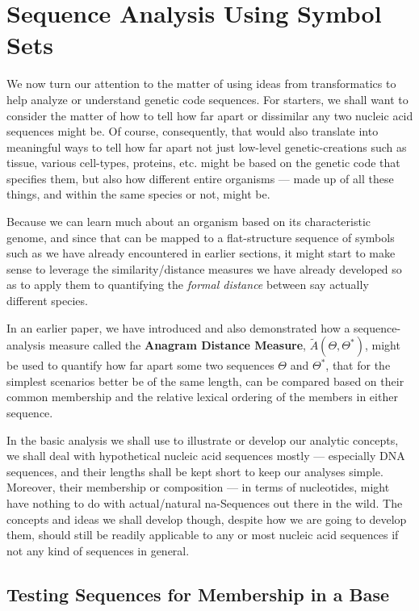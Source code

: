 \documentclass[a4paper, 18pt]{book} %
\begin{document}
\chapter{Sequence Analysis Using Symbol Sets}
\label{SEC3}


We now turn our attention to the matter of using ideas from transformatics to help analyze or understand genetic code sequences. For starters, we shall want to consider the matter of how to tell how far apart or dissimilar any two nucleic acid sequences might be. Of course, consequently, that would also translate into meaningful ways to tell how far apart not just low-level genetic-creations such as tissue, various cell-types, proteins, etc. might be based on the genetic code that specifies them, but also how different entire organisms --- made up of all these things, and within the same species or not, might be.

Because we can learn much about an organism based on its characteristic genome, and since that can be mapped to a flat-structure sequence of symbols such as we have already encountered in earlier sections, it might start to make sense to leverage the similarity/distance measures we have already developed so as to apply them to quantifying the \textit{formal distance} between say actually different species. 

In an earlier paper\cite{adtpaper}, we have introduced and also demonstrated how a sequence-analysis measure called the \textbf{Anagram Distance Measure}, $\tilde{A}(\Theta,\Theta^*)$, might be used to quantify how far apart some two sequences $\Theta$ and $\Theta^*$, that for the simplest scenarios better be of the same length, can be compared based on their common membership and the relative lexical ordering of the members in either sequence.

In the basic analysis we shall use to illustrate or develop our analytic concepts, we shall deal with hypothetical nucleic acid sequences mostly --- especially DNA sequences, and their lengths shall be kept short to keep our analyses simple. Moreover, their membership or composition --- in terms of nucleotides, might have nothing to do with actual/natural na-Sequences out there in the wild. The concepts and ideas we shall develop though, despite how we are going to develop them, should still be readily applicable to any or most nucleic acid sequences if not any kind of sequences in general.


\section{Testing Sequences for Membership in a Base}
\end{document}
